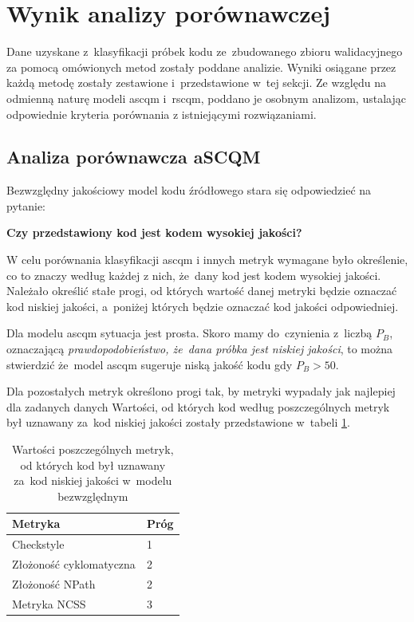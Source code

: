 \documentclass[twoside]{praca}
\begin{document}
\section{Wynik analizy porównawczej}

Dane uzyskane z~klasyfikacji próbek kodu ze~zbudowanego zbioru walidacyjnego za pomocą omówionych metod zostały poddane analizie. Wyniki osiągane przez każdą metodę zostały zestawione i~przedstawione w~tej sekcji. Ze względu na odmienną naturę modeli \gls{ascqm} i~\gls{rscqm}, poddano je osobnym analizom, ustalając odpowiednie kryteria porównania z istniejącymi rozwiązaniami.

\pagebreak

\subsection{Analiza porównawcza aSCQM}

Bezwzględny jakościowy model kodu źródłowego stara się odpowiedzieć na pytanie: 
\centerline{\textbf{Czy przedstawiony kod jest kodem wysokiej jakości?}}

W celu porównania klasyfikacji \gls{ascqm} i innych metryk wymagane było określenie, co to znaczy według każdej z nich, że~dany kod jest kodem wysokiej jakości. Należało określić stałe progi, od których wartość danej metryki będzie oznaczać kod niskiej jakości, a~poniżej których będzie oznaczać kod jakości odpowiedniej.

Dla modelu \gls{ascqm} sytuacja jest prosta. Skoro mamy do~czynienia z~liczbą $P_B$, oznaczającą \textit{prawdopodobieństwo, że~dana próbka jest niskiej jakości}, to można stwierdzić że~model \gls{ascqm} sugeruje niską jakość kodu gdy $P_B>50$.

Dla pozostałych metryk określono progi tak, by metryki wypadały jak najlepiej dla zadanych danych 
Wartości, od których kod według poszczególnych metryk był uznawany za~kod niskiej jakości zostały przedstawione w~tabeli \ref{tbl:eval:ascqm-thresholds}.

\begin{table}[h]
\centering
\caption{Wartości poszczególnych metryk, od których kod był uznawany za~kod niskiej jakości w~modelu bezwzględnym}
\label{tbl:eval:ascqm-thresholds}
\begin{tabular}{|l|l|}
  \hline 
  \textbf{Metryka} & \textbf{Próg} \\ \hline
  Checkstyle & 1 \\ \hline
  Złożoność cyklomatyczna & 2 \\ \hline
  Złożoność NPath & 2 \\ \hline
  Metryka NCSS & 3 \\ \hline
\end{tabular} 
\end{table}
\end{document}
